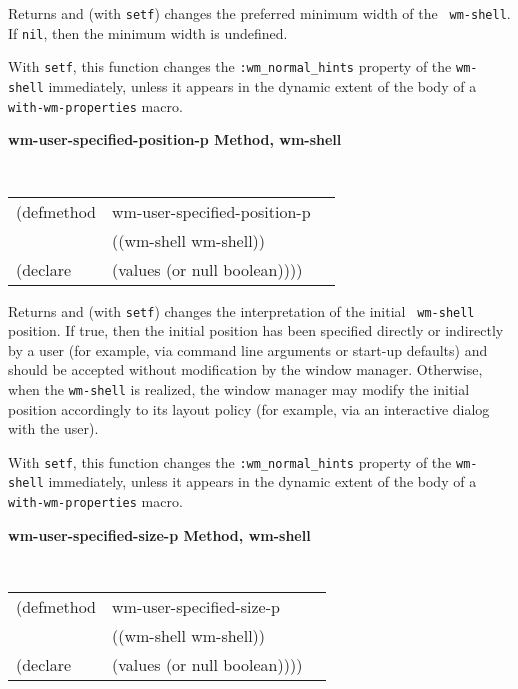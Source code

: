 \documentclass[twoside]{book}
\begin{document}
\begin{sloppy}
{\begin{flushright}
{}\end{flushright}}

\begin{flushright} \parbox[t]{6.125in}{
Returns and (with {\tt setf}) changes the preferred minimum width of the {\tt
wm-shell}. If {\tt nil}, then the minimum width is undefined. 

With {\tt setf}, this function changes the {\tt :wm\_normal\_hints} property of
the {\tt wm-shell} immediately, unless it appears in the dynamic extent of the
body of a {\tt with-wm-properties} macro.

}\end{flushright}


{\samepage
{\large {\bf wm-user-specified-position-p \hfill Method, wm-shell}}
\begin{flushright} \parbox[t]{6.125in}{
\tt
\begin{tabular}{lll}
\raggedright
(defmethod & wm-user-specified-position-p & \\
           & ((wm-shell  wm-shell)) \\
(declare   & (values (or null boolean))))
\end{tabular}
\rm

}\end{flushright}}

\begin{flushright} \parbox[t]{6.125in}{
Returns and (with {\tt setf}) changes the interpretation of the initial {\tt
wm-shell} position. If true, then the initial position has been specified
directly or indirectly by a user (for example, via command line arguments or
start-up defaults) and should be accepted without modification by the window
manager. Otherwise, when the {\tt wm-shell} is realized, the window manager may
modify the initial position accordingly to its layout policy (for example, via
an interactive dialog with the user).

With {\tt setf}, this function changes the {\tt :wm\_normal\_hints} property of
the {\tt wm-shell} immediately, unless it appears in the dynamic extent of the
body of a {\tt with-wm-properties} macro.

}\end{flushright}


{\samepage
{\large {\bf wm-user-specified-size-p \hfill Method, wm-shell}}
\begin{flushright} \parbox[t]{6.125in}{
\tt
\begin{tabular}{lll}
\raggedright
(defmethod & wm-user-specified-size-p & \\
           & ((wm-shell  wm-shell)) \\
(declare   & (values (or null boolean))))
\end{tabular}
\rm

}
\end{flushright}}
\end{sloppy}
\end{document}

